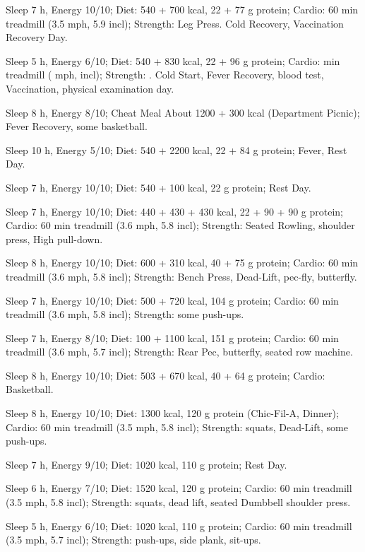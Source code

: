 \item [Sep 30] Sleep 7 h, Energy 10/10; Diet: 540 + 700 kcal, 22 + 77 g protein; Cardio: 60 min treadmill (3.5 mph, 5.9 incl); Strength: Leg Press. Cold Recovery, Vaccination Recovery Day.
\item [Sep 29] Sleep 5 h, Energy 6/10; Diet: 540 + 830 kcal, 22 + 96 g protein; Cardio:  min treadmill ( mph, incl); Strength: . Cold Start, Fever Recovery, blood test, Vaccination, physical examination day. 
\item [Sep 28] Sleep 8 h, Energy 8/10; Cheat Meal About 1200 + 300 kcal (Department Picnic); Fever Recovery, some basketball.
\item [Sep 27] Sleep 10 h, Energy 5/10; Diet: 540 + 2200 kcal, 22 + 84 g protein; Fever, Rest Day.
\item [Sep 26] Sleep 7 h, Energy 10/10; Diet: 540 + 100 kcal, 22 g protein; Rest Day.
\item [Sep 25] Sleep 7 h, Energy 10/10; Diet: 440 + 430 + 430 kcal, 22 + 90 + 90 g protein; Cardio: 60 min treadmill (3.6 mph, 5.8 incl); Strength: Seated Rowling, shoulder press, High pull-down.
\item [Sep 24] Sleep 8 h, Energy 10/10; Diet:  600 + 310 kcal, 40 + 75 g protein; Cardio: 60 min treadmill (3.6 mph, 5.8 incl); Strength: Bench Press, Dead-Lift, pec-fly, butterfly.
\item [Sep 23] Sleep 7 h, Energy 10/10; Diet: 500 + 720 kcal, 104 g protein; Cardio: 60 min treadmill (3.6 mph,  5.8 incl); Strength: some push-ups.
\item [Sep 22] Sleep 7 h, Energy 8/10; Diet:  100 + 1100 kcal, 151 g protein; Cardio: 60 min treadmill (3.6 mph,  5.7 incl); Strength: Rear Pec, butterfly, seated row machine.
\item [Sep 21] Sleep 8 h, Energy 10/10; Diet:  503 + 670 kcal,  40 + 64 g protein; Cardio: Basketball.
\item [Sep 20] Sleep 8 h, Energy 10/10; Diet: 1300 kcal, 120 g protein (Chic-Fil-A, Dinner); Cardio: 60 min treadmill (3.5 mph, 5.8 incl); Strength: squats, Dead-Lift, some push-ups.
\item [Sep 19] Sleep 7 h, Energy 9/10; Diet: 1020 kcal, 110 g protein; Rest Day.
\item [Sep 18] Sleep 6 h, Energy 7/10; Diet: 1520 kcal, 120 g protein; Cardio: 60 min treadmill (3.5 mph, 5.8 incl); Strength: squats, dead lift, seated Dumbbell shoulder press.
\item [Sep 17] Sleep 5 h, Energy 6/10; Diet: 1020 kcal, 110 g protein; Cardio: 60 min treadmill (3.5 mph, 5.7 incl); Strength: push-ups, side plank, sit-ups.
